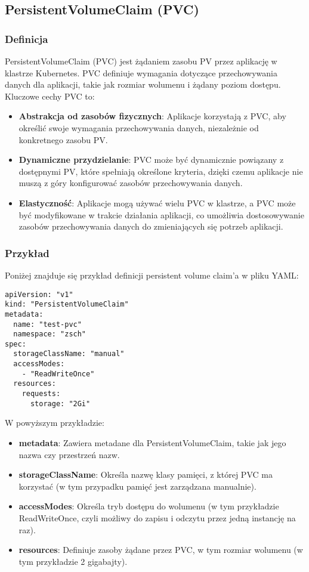 \documentclass[polish,envcountsect,10pt]{article}
\begin{document}
\subsection{PersistentVolumeClaim (PVC)}

\subsubsection{Definicja}

PersistentVolumeClaim (PVC) jest żądaniem zasobu PV przez aplikację w klastrze Kubernetes. PVC definiuje wymagania dotyczące przechowywania danych dla aplikacji, takie jak rozmiar wolumenu i żądany poziom dostępu. Kluczowe cechy PVC to:

\begin{itemize}
    \item \textbf{Abstrakcja od zasobów fizycznych}: Aplikacje korzystają z PVC, aby określić swoje wymagania przechowywania danych, niezależnie od konkretnego zasobu PV.
    \item \textbf{Dynamiczne przydzielanie}: PVC może być dynamicznie powiązany z dostępnymi PV, które spełniają określone kryteria, dzięki czemu aplikacje nie muszą z góry konfigurować zasobów przechowywania danych.
    \item \textbf{Elastyczność}: Aplikacje mogą używać wielu PVC w klastrze, a PVC może być modyfikowane w trakcie działania aplikacji, co umożliwia dostosowywanie zasobów przechowywania danych do zmieniających się potrzeb aplikacji.
\end{itemize}

\subsubsection{Przykład}

Poniżej znajduje się przykład definicji persistent volume claim'a w pliku YAML:

\begin{verbatim}
apiVersion: "v1"
kind: "PersistentVolumeClaim"
metadata:
  name: "test-pvc"
  namespace: "zsch"
spec:
  storageClassName: "manual"
  accessModes:
    - "ReadWriteOnce"
  resources:
    requests:
      storage: "2Gi"
\end{verbatim}

\noindent W powyższym przykładzie:
\begin{itemize}
    \item \textbf{metadata}: Zawiera metadane dla PersistentVolumeClaim, takie jak jego nazwa czy przestrzeń nazw.
    \item \textbf{storageClassName}: Określa nazwę klasy pamięci, z której PVC ma korzystać (w tym przypadku pamięć jest zarządzana manualnie).
    \item \textbf{accessModes}: Określa tryb dostępu do wolumenu (w tym przykładzie ReadWriteOnce, czyli możliwy do zapisu i odczytu przez jedną instancję na raz).
    \item \textbf{resources}: Definiuje zasoby żądane przez PVC, w tym rozmiar wolumenu (w tym przykładzie 2 gigabajty).
\end{itemize}
\end{document}
